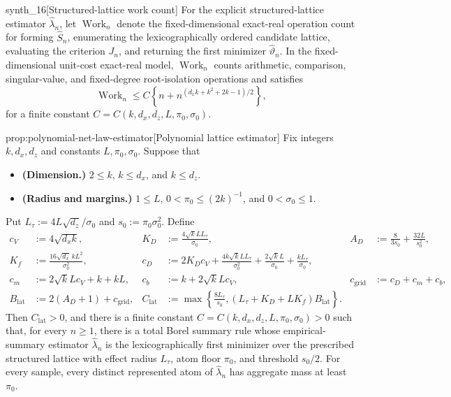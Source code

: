 \documentclass[11pt]{article}
\begin{document}
\begin{definitionv}{synth_16}[Structured-lattice work count]
For the explicit structured-lattice estimator \(\widehat\lambda_n\), let \(\operatorname{Work}_n\) denote the fixed-dimensional exact-real operation count for forming \(\widehat S_n\), enumerating the lexicographically ordered candidate lattice, evaluating the criterion \(J_n\), and returning the first minimizer \(\widehat\vartheta_n\). In the fixed-dimensional unit-cost exact-real model, \(\operatorname{Work}_n\) counts arithmetic, comparison, singular-value, and fixed-degree root-isolation operations and satisfies
\[
\operatorname{Work}_n\le C\left\{n+n^{(d_xk+k^2+2k-1)/2}\right\},
\]
for a finite constant \(C=C(k,d_x,d_z,L,\pi_0,\sigma_0)\).
\end{definitionv}

\begin{propositionv}{prop:polynomial-net-law-estimator}[Polynomial lattice estimator]
Fix integers \(k,d_x,d_z\) and constants \(L,\pi_0,\sigma_0\).  Suppose that
\begin{itemize}
\item \textbf{(Dimension.)} \(2\le k\), \(k\le d_x\), and \(k\le d_z\).
\item \textbf{(Radius and margins.)} \(1\le L\), \(0<\pi_0\le (2k)^{-1}\), and \(0<\sigma_0\le 1\).
\end{itemize}
Put \(L_\tau:=4L\sqrt{d_z}/\sigma_0\) and \(s_0:=\pi_0\sigma_0^2\).  Define
\[
\begin{aligned}
c_V&:=4\sqrt{d_xk},
&
K_D&:=\frac{4\sqrt{k}LL_\tau}{\sigma_0},
&
A_D&:=\frac{8}{3s_0}+\frac{32L}{s_0^2},\\
K_f&:=\frac{16\sqrt{d_x}\,kL^2}{\sigma_0^2},
&
c_D&:=2K_Dc_V+\frac{4k\sqrt{k}LL_\tau}{\sigma_0^2}
+\frac{2\sqrt{k}L}{\sigma_0}+\frac{kL_\tau}{\sigma_0},\\
c_m&:=2\sqrt{k}Lc_V+k+kL,
&
c_b&:=k+2\sqrt{k}Lc_V,
&
c_{\mathrm{grid}}&:=c_D+c_m+c_b,\\
B_{\mathrm{lat}}&:=2(A_D+1)+c_{\mathrm{grid}},
&
C_{\mathrm{lat}}&:=\max\!\left\{\frac{8L_\tau}{s_0},
(L_\tau+K_D+LK_f)B_{\mathrm{lat}}\right\}.
\end{aligned}
\]
Then \(C_{\mathrm{lat}}>0\), and there is a finite constant
\(C=C(k,d_x,d_z,L,\pi_0,\sigma_0)>0\) such that, for every \(n\ge1\), there is a total Borel summary rule whose empirical-summary estimator \(\widehat\lambda_n\) is the lexicographically first minimizer over the prescribed structured lattice with effect radius \(L_\tau\), atom floor \(\pi_0\), and threshold \(s_0/2\).  For every sample, every distinct represented atom of \(\widehat\lambda_n\) has aggregate mass at least \(\pi_0\).


\end{propositionv}
\end{document}
